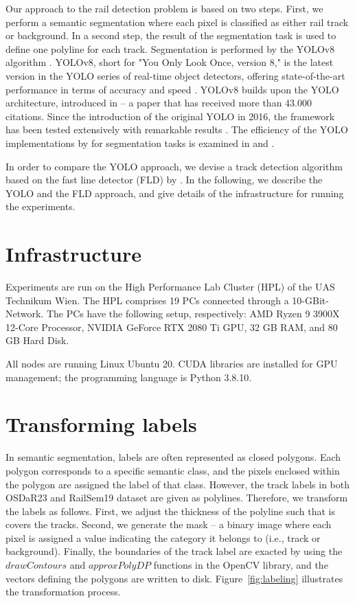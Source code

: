 \documentclass[Master,MDS,english]{BASE/twbook} %
\begin{document}
Our approach to the rail detection problem is based on two steps. First, we perform a semantic segmentation where each pixel is classified as either rail track or background. In a second step, the result of the segmentation task is used to define one polyline for each track. Segmentation is performed by the YOLOv8 algorithm \citep{Jocher_Ultralytics_YOLO_2023}.  YOLOv8, short for "You Only Look Once, version 8," is the latest version in the YOLO series of real-time object detectors, offering state-of-the-art performance in terms of accuracy and speed \citep{ultralytics_docs}. YOLOv8 builds upon the YOLO architecture, introduced in \cite{redmon2016you} -- a paper that has received more than 43.000 citations. Since the introduction of the original YOLO in 2016, the framework has been tested extensively with remarkable results \citep{JIANG20221066, cryptography6020016, Diwan2023}. The efficiency of the YOLO implementations by \cite{Jocher_Ultralytics_YOLO_2023} for segmentation tasks is examined in \cite{agriculture13081643} and \cite{STRAKER2023100045}.


In order to compare the YOLO approach, we devise a track detection algorithm based on the fast line detector (FLD) by \cite{FLD}.
In the following, we describe the YOLO and the FLD approach, and give details of the infrastructure for running the experiments.

\section{Infrastructure}

Experiments are run on the High Performance Lab Cluster (HPL) of the UAS Technikum Wien. 
The HPL comprises 19 PCs connected through a 10-GBit-Network. The PCs have the following setup, respectively: AMD Ryzen 9 3900X 12-Core Processor, NVIDIA GeForce RTX 2080 Ti GPU, 32 GB RAM, and 80 GB Hard Disk.

All nodes are running Linux Ubuntu 20. CUDA libraries are installed for GPU management; the programming language is Python 3.8.10. 


\section{Transforming labels} 

In semantic segmentation, labels are often represented as closed polygons. Each polygon corresponds to a specific semantic class, and the pixels enclosed within the polygon are assigned the label of that class.
However, the track labels in both OSDaR23 and RailSem19 dataset are given as polylines. Therefore, we transform the labels as follows. First, we adjust the thickness of the polyline such that is covers the tracks. Second, we generate the mask -- a binary image where each pixel is assigned a value indicating the category it belongs to (i.e., track or background). Finally, the boundaries of the track label are exacted by using the $drawContours$ and $approxPolyDP$ functions in the OpenCV library, and the vectors defining the polygons are written to disk.  Figure~\ref{fig:labeling} illustrates the transformation process.
\end{document}
